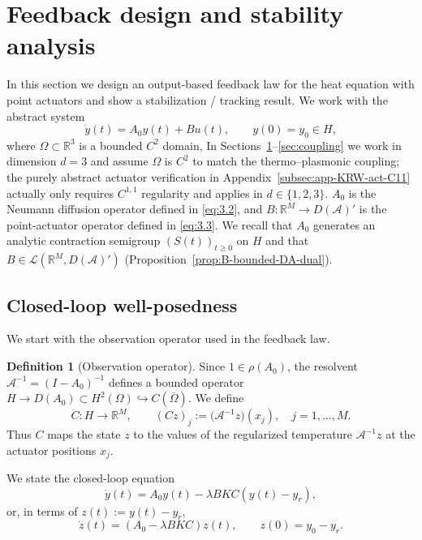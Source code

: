 \documentclass[11pt,a4paper]{article}
\numberwithin{equation}{section}
\theoremstyle{definition}
\newtheorem{definition}[theorem]{Definition}
\newcommand{\1}{\mathbbm{1}}
\begin{document}
\section{Feedback design and stability analysis}
\label{sec:feedback}
\noindent
In this section we design an output-based feedback law for the heat equation
with point actuators and show a stabilization / tracking result.
\newline
We work with the abstract system
\begin{equation}
\label{eq:feedback-abstract-system}
\dot y(t) = A_0 y(t) + B u(t),\qquad y(0)=y_0\in H,
\end{equation}
where $\Omega\subset\mathbb{R}^3$ is a bounded $C^2$ domain, In Sections~\ref{sec:feedback}--\ref{sec:coupling} we work in dimension $d=3$ and assume $\Omega$ is $C^2$ to match the thermo--plasmonic coupling; the purely abstract actuator verification in Appendix~\ref{subsec:app-KRW-act-C11} actually only requires $C^{1,1}$ regularity and applies in $d\in\{1,2,3\}$.
 $A_0$ is the
Neumann diffusion operator defined in \eqref{eq:3.2}, and $B:\mathbb{R}^M\to D(\mathcal A)'$
is the point-actuator operator defined in \eqref{eq:3.3}. We recall that $A_0$
generates an analytic contraction semigroup $(S(t))_{t\ge0}$ on $H$ and that
$B\in\mathcal{L}(\mathbb{R}^M,D(\mathcal A)')$
(Proposition~\ref{prop:B-bounded-DA-dual}).

\subsection{Closed-loop well-posedness}
\noindent
We start with the observation operator used in the feedback law.

\begin{definition}[Observation operator]
\label{def:obs-C-full}
Since $1\in\rho(A_0)$, the resolvent $\mathcal A^{-1}=(I-A_0)^{-1}$ defines a bounded operator
$H\to D(A_0)\subset H^2(\Omega)\hookrightarrow C(\overline\Omega)$. We define
\begin{equation}
\label{eq:def-C-full}
C:H\to\mathbb{R}^M,\qquad
(Cz)_j := \big(\mathcal A^{-1}z\big)(x_j),\quad j=1,\dots,M.
\end{equation}
Thus $C$ maps the state $z$ to the values of the regularized temperature
$\mathcal A^{-1}z$ at the actuator positions $x_j$.
\end{definition}
\noindent
We state
the closed-loop equation
\begin{equation}
\label{eq:closed-loop}
\dot y(t) = A_0 y(t) - \lambda B K C (y(t)-y_r),
\end{equation}
or, in terms of $z(t):=y(t)-y_r$,
\begin{equation}
\label{eq:closed-loop-z}
\dot z(t) = (A_0 - \lambda BKC) z(t),\qquad z(0)=y_0-y_r.
\end{equation}
\end{document}
